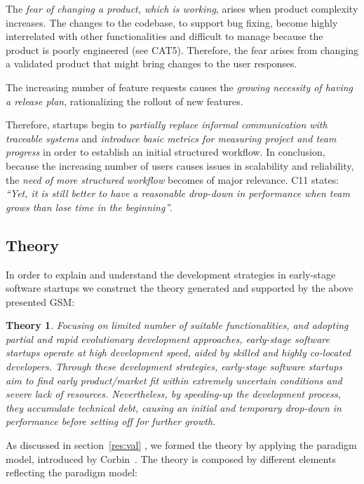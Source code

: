 \documentclass[10pt,journal,letterpaper,compsoc]{IEEEtran}
\newtheorem*{theory}{Theory}
\begin{document}
The \textit{fear of changing a product, which is working}, arises when product
complexity increases. The changes to the codebase, to support bug fixing, become
highly interrelated with other functionalities and difficult to manage because
the product is poorly engineered (see CAT5). Therefore, the fear arises from
changing a validated product that might bring changes to the user responses.

The increasing number of feature requests causes the \textit{growing necessity
of having a release plan}, rationalizing the rollout of new features.

Therefore, startups begin to \textit{partially replace informal communication
with traceable systems} and \textit{introduce basic metrics for measuring
project and team progress} in order to establish an initial structured workflow.
In conclusion, because the increasing number of users causes issues in
scalability and reliability, the \textit{need of more structured workflow}
becomes of major relevance. C11 states: \textit{``Yet, it is still better to
have a reasonable drop-down in performance when team grows than lose time in the
beginning''}.
\subsection{Theory}\label{res:gsm:th}
In order to explain and understand the development strategies in early-stage 
software startups we construct the theory generated and supported by the above 
presented GSM:

\begin{theory} Focusing on limited number of suitable functionalities, and
adopting partial and rapid evolutionary development approaches, early-stage
software startups operate at high development speed, aided by skilled and
highly co-located developers. Through these development strategies, early-stage
software startups aim to find early product/market fit within extremely
uncertain conditions and severe lack of resources. Nevertheless, by speeding-up
the development process, they accumulate technical debt, causing an initial and
temporary drop-down in performance before setting off for further growth.
\end{theory}

As discussed in section~\ref{res:val} %
, we formed the theory by applying the paradigm model, introduced by 
Corbin~\cite{Corbin1990}. The theory is composed by different elements 
reflecting the paradigm model:
\end{document}

